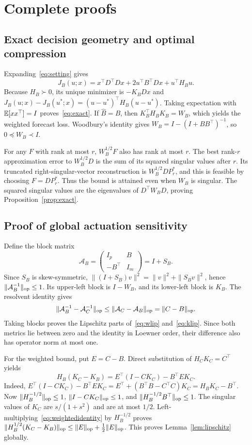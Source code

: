 \clearpage\appendix
\section{Complete proofs}
\subsection{Exact decision geometry and optimal compression}
Expanding~\eqref{eq:setting} gives
\[
 J_B(u;x)=x^\top D^\top Dx+2u^\top B^\top Dx+u^\top H_Bu.
\]
Because $H_B\succ0$, its unique minimizer is $-K_BDx$ and
$J_B(u;x)-J_B(u^*;x)=(u-u^*)^\top H_B(u-u^*)$.
Taking expectation with $\mathbb E[xx^\top]=I$ proves~\eqref{eq:exact}. If $\widehat B=B$, then $K_B^\top H_BK_B=W_B$, which yields the weighted forecast loss. Woodbury's identity gives $W_B=I-(I+BB^\top)^{-1}$, so $0\preceq W_B\prec I$.

For any $F$ with rank at most $r$, $W_B^{1/2}F$ also has rank at most $r$. The best rank-$r$ approximation error to $W_B^{1/2}D$ is the sum of its squared singular values after $r$. Its truncated right-singular-vector reconstruction is $W_B^{1/2}DP_r^*$, and this is feasible by choosing $F=DP_r^*$. Thus the bound is attained even when $W_B$ is singular. The squared singular values are the eigenvalues of $D^\top W_BD$, proving Proposition~\ref{prop:exact}.

\subsection{Proof of global actuation sensitivity}
Define the block matrix
\[
 \mathcal A_B=\begin{pmatrix}I_p&B\\-B^\top&I_m\end{pmatrix}=I+S_B.
\]
Since $S_B$ is skew-symmetric, $\|(I+S_B)v\|^2=\|v\|^2+\|S_Bv\|^2$, hence $\|\mathcal A_B^{-1}\|_{\mathrm{op}}\le1$. Its upper-left block is $I-W_B$, and its lower-left block is $K_B$. The resolvent identity gives
\[
 \|\mathcal A_B^{-1}-\mathcal A_C^{-1}\|_{\mathrm{op}}
 \le\|\mathcal A_C-\mathcal A_B\|_{\mathrm{op}}=\|C-B\|_{\mathrm{op}}.
\]
Taking blocks proves the Lipschitz parts of~\eqref{eq:wlip} and~\eqref{eq:klip}. Since both metrics lie between zero and the identity in Loewner order, their difference also has operator norm at most one.

For the weighted bound, put $E=C-B$. Direct substitution of $H_CK_C=C^\top$ yields
\begin{equation}\label{eq:weightedidentity}
 H_B(K_C-K_B)=E^\top(I-CK_C)-B^\top E K_C.
\end{equation}
Indeed, $E^\top(I-CK_C)-B^\top EK_C
=E^\top+(B^\top B-C^\top C)K_C
=H_BK_C-B^\top$.
Now $\|H_B^{-1/2}\|_{\mathrm{op}}\le1$, $\|I-CK_C\|_{\mathrm{op}}\le1$, and $\|H_B^{-1/2}B^\top\|_{\mathrm{op}}\le1$. The singular values of $K_C$ are $s/(1+s^2)$ and are at most $1/2$. Left-multiplying~\eqref{eq:weightedidentity} by $H_B^{-1/2}$ proves
$\|H_B^{1/2}(K_C-K_B)\|_{\mathrm{op}}\le\|E\|_{\mathrm{op}}+\frac12\|E\|_{\mathrm{op}}$.
This proves Lemma~\ref{lem:lipschitz} globally.


